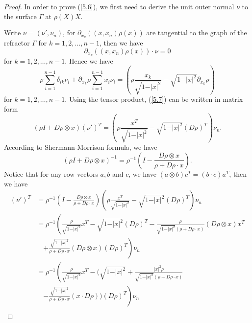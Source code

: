 \documentclass[a4paper,12pt,]{article}
\numberwithin{equation}{section}
\numberwithin{equation}{section} \allowdisplaybreaks
\begin{document}
\begin{proof}
  In order to prove (\ref{5.6}), we first need to derive the unit outer normal $\nu$ to the surface $\Gamma$ at $\rho(X)X$.

  Write $\nu = (\nu',\nu_{n})$, for $\partial_{x_{k}}((x,x_{n})\rho(x))$ are tangential to the graph of the refractor $\Gamma$ for $k = 1,2,\ldots,n-1$, then we have
  $$\partial_{x_{k}}((x,x_{n})\rho(x))\cdot \nu = 0$$
  for $k = 1,2,\ldots,n-1$. Hence we have
  \begin{equation}\label{5.7}
    \rho \sum_{i = 1}^{n-1}\delta_{ik}\nu_{i} + \partial_{x_{k}}\rho \sum_{i = 1}^{n-1}x_{i}\nu_{i} = \left(\rho \frac{x_{k}}{\sqrt{1 - \vert x \vert^{2}}} - \sqrt{1 - \vert x \vert^{2}}\partial_{x_{k}}\rho\right)
  \end{equation}
  for $k = 1,2,\ldots,n-1$. Using the tensor product, (\ref{5.7}) can be written in matrix form
  \begin{equation}\label{5.8}
    (\rho I + D\rho \otimes x)(\nu')^{T} = \left(\rho \frac{x^{T}}{\sqrt{1 - \vert x \vert^{2}}} - \sqrt{1 - \vert x \vert^{2}}(D\rho)^{T}\right)\nu_{n}.
  \end{equation}
  According to Shermann-Morrison formula, we have
  \begin{equation*}
    (\rho I + D\rho \otimes x)^{-1} = \rho^{-1}\left(I - \frac{D\rho \otimes x}{\rho + D\rho \cdot x}\right).
  \end{equation*}
  Notice that for any row vectors $a,b$ and $c$, we have $(a \otimes b)c^{T} = (b \cdot c)a^{T}$, then we have
  \begin{align*}
    (\nu')^{T} & = \rho^{-1}\left(I - \frac{D\rho \otimes x}{\rho + D\rho \cdot x}\right)\left(\rho \frac{x^{T}}{\sqrt{1 - \vert x \vert^{2}}} - \sqrt{1 - \vert x \vert^{2}}(D\rho)^{T}\right)\nu_{n} \\
     & = \rho^{-1}\left(\frac{\rho}{\sqrt{1 - \vert x \vert^{2}}}x^{T} - \sqrt{1 - \vert x \vert^{2}}(D\rho)^{T} - \frac{\rho}{\sqrt{1 - \vert x \vert^{2}}(\rho + D\rho \cdot x)}(D\rho \otimes x)x^{T}\right. \\
     & \quad \left. + \frac{\sqrt{1 - \vert x \vert^{2}}}{\rho + D\rho \cdot x}(D\rho \otimes x)(D\rho)^{T}\right)\nu_{n} \\
     & = \rho^{-1}\left(\frac{\rho}{\sqrt{1 - \vert x \vert^{2}}}x^{T} - (\sqrt{1 - \vert x \vert^{2}} + \frac{\vert x \vert^{2}\rho}{\sqrt{1 - \vert x \vert^{2}}(\rho + D\rho \cdot x)}\right. \\
     & \quad \left. - \frac{\sqrt{1 - \vert x \vert^{2}}}{\rho + D\rho \cdot x}(x \cdot D\rho))(D\rho)^{T}\right)\nu_{n} \\

\end{align*}
\end{proof}
\end{document}

